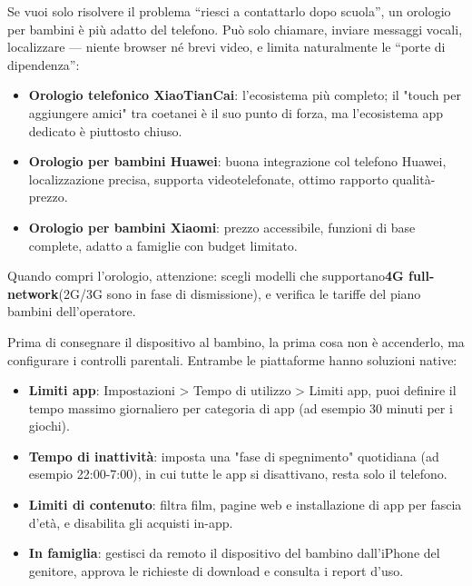
Se vuoi solo risolvere il problema “riesci a contattarlo dopo scuola”, un orologio per bambini è più adatto del telefono. Può solo chiamare, inviare messaggi vocali, localizzare — niente browser né brevi video, e limita naturalmente le “porte di dipendenza”:

\begin{itemize}
  \item \textbf{Orologio telefonico XiaoTianCai}: l'ecosistema più completo; il "touch per aggiungere amici" tra coetanei è il suo punto di forza, ma l'ecosistema app dedicato è piuttosto chiuso.
  \item \textbf{Orologio per bambini Huawei}: buona integrazione col telefono Huawei, localizzazione precisa, supporta videotelefonate, ottimo rapporto qualità-prezzo.
  \item \textbf{Orologio per bambini Xiaomi}: prezzo accessibile, funzioni di base complete, adatto a famiglie con budget limitato.
\end{itemize}

Quando compri l'orologio, attenzione: scegli modelli che supportano\textbf{4G full-network}(2G/3G sono in fase di dismissione), e verifica le tariffe del piano bambini dell'operatore.


Prima di consegnare il dispositivo al bambino, la prima cosa non è accenderlo, ma configurare i controlli parentali. Entrambe le piattaforme hanno soluzioni native:


\begin{itemize}
  \item \textbf{Limiti app}: Impostazioni > Tempo di utilizzo > Limiti app, puoi definire il tempo massimo giornaliero per categoria di app (ad esempio 30 minuti per i giochi).
  \item \textbf{Tempo di inattività}: imposta una "fase di spegnimento" quotidiana (ad esempio 22:00-7:00), in cui tutte le app si disattivano, resta solo il telefono.
  \item \textbf{Limiti di contenuto}: filtra film, pagine web e installazione di app per fascia d'età, e disabilita gli acquisti in-app.
  \item \textbf{In famiglia}: gestisci da remoto il dispositivo del bambino dall'iPhone del genitore, approva le richieste di download e consulta i report d'uso.
\end{itemize}

